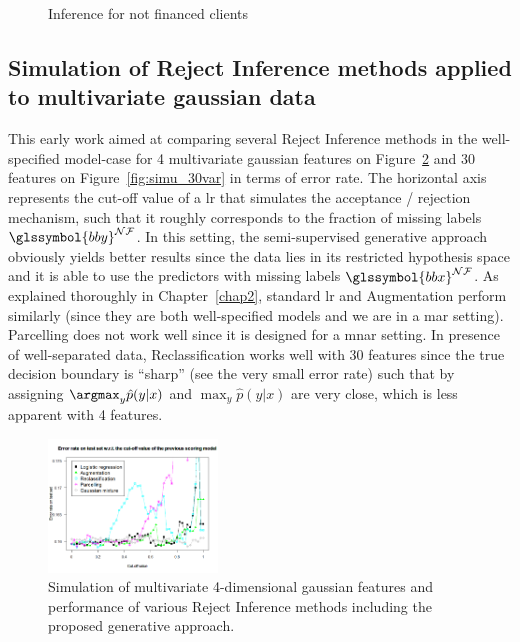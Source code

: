 \begin{table}
{\begin{multicols}{3}
\begin{subfigure}[t]{0.31\textwidth}
\caption{Inference for not financed clients}
\label{parcel:sfig3}
\end{subfigure}

\end{multicols}
}
\end{table}



\subsection{Simulation of Reject Inference methods applied to multivariate gaussian data} \label{subsec:app_reject_real}

This early work aimed at comparing several Reject Inference methods in the well-specified model-case for 4 multivariate gaussian features on Figure~\ref{fig:simu_4var} and 30 features on Figure~\ref{fig:simu_30var} in terms of error rate. The horizontal axis represents the cut-off value of a \gls{lr} that simulates the acceptance / rejection mechanism, such that it roughly corresponds to the fraction of missing labels $\glssymbol{bby}^{\mathcal{N}\mathcal{F}}$. In this setting, the semi-supervised generative approach obviously yields better results since the data lies in its restricted hypothesis space and it is able to use the predictors with missing labels $\glssymbol{bbx}^{\mathcal{N}\mathcal{F}}$. As explained thoroughly in Chapter~\ref{chap2}, standard \gls{lr} and Augmentation perform similarly (since they are both well-specified models and we are in a \gls{mar} setting). Parcelling does not work well since it is designed for a \gls{mnar} setting. In presence of well-separated data, Reclassification works well with 30 features since the true decision boundary is ``sharp'' (see the very small error rate) such that by assigning $\argmax_y \hat{p}(y | x)$ and $\max_y \hat{p}(y | x)$ are very close, which is less apparent with 4 features.


\begin{figure}[H]
\centering
\includegraphics[width=0.4\textwidth]{figures/appendix/rejectinferencesimulation4var.png}
\caption{Simulation of multivariate 4-dimensional gaussian features and performance of various Reject Inference methods including the proposed generative approach.}
\label{fig:simu_4var}
\end{figure}

